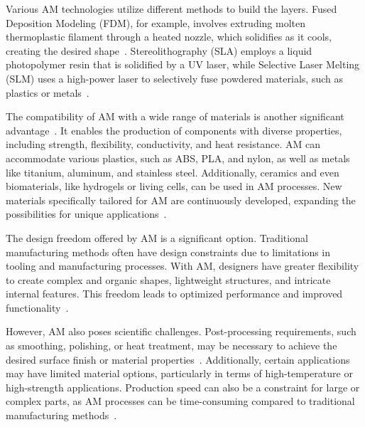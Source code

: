 Various AM technologies utilize different methods to build the layers. Fused Deposition Modeling (FDM), for example, involves extruding molten thermoplastic filament through a heated nozzle, which solidifies as it cools, creating the desired shape~\cite{Wickramasinghe.2020}. Stereolithography (SLA) employs a liquid photopolymer resin that is solidified by a UV laser, while Selective Laser Melting (SLM) uses a high-power laser to selectively fuse powdered materials, such as plastics or metals~\cite{Wang.2016, Meier.2017}.

The compatibility of AM with a wide range of materials is another significant advantage~\cite{Bose.2018}. It enables the production of components with diverse properties, including strength, flexibility, conductivity, and heat resistance. AM can accommodate various plastics, such as ABS, PLA, and nylon, as well as metals like titanium, aluminum, and stainless steel. Additionally, ceramics and even biomaterials, like hydrogels or living cells, can be used in AM processes. New materials specifically tailored for AM are continuously developed,  expanding the possibilities for unique applications~\cite{Attaran.2017}.

The design freedom offered by AM is a significant option. Traditional manufacturing methods often have design constraints due to limitations in tooling and manufacturing processes. With AM, designers have greater flexibility to create complex and organic shapes, lightweight structures, and intricate internal features. This freedom leads to optimized performance and improved functionality~\cite{Plocher.2019}.

However, AM also poses scientific challenges. Post-processing requirements, such as smoothing, polishing, or heat treatment, may be necessary to achieve the desired surface finish or material properties~\cite{Jandyal.2022}. Additionally, certain applications may have limited material options, particularly in terms of high-temperature or high-strength applications. Production speed can also be a constraint for large or complex parts, as AM processes can be time-consuming compared to traditional manufacturing methods~\cite{Dilberoglu.2017}.


